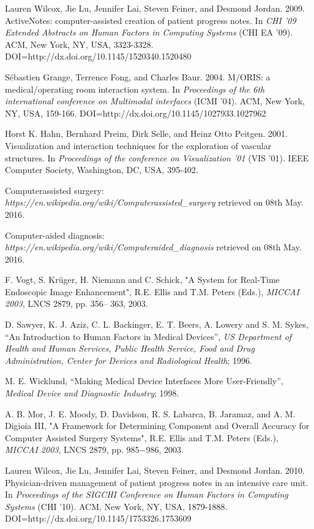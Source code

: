 \begin{thebibliography}{}
\bibitem{} Lauren Wilcox, Jie Lu, Jennifer Lai, Steven Feiner, and Desmond Jordan. 2009. ActiveNotes: computer-assisted creation of patient progress notes. In \emph{CHI '09 Extended Abstracts on Human Factors in Computing Systems} (CHI EA '09). ACM, New York, NY, USA, 3323-3328. DOI=http://dx.doi.org/10.1145/1520340.1520480

\bibitem{} Sébastien Grange, Terrence Fong, and Charles Baur. 2004. M/ORIS: a medical/operating room interaction system. In \emph{Proceedings of the 6th international conference on Multimodal interfaces} (ICMI '04). ACM, New York, NY, USA, 159-166. DOI=http://dx.doi.org/10.1145/1027933.1027962

\bibitem{} Horst K. Hahn, Bernhard Preim, Dirk Selle, and Heinz Otto Peitgen. 2001. Visualization and interaction techniques for the exploration of vascular structures. In \emph{Proceedings of the conference on Visualization '01} (VIS '01). IEEE Computer Society, Washington, DC, USA, 395-402.

\bibitem{} Computer\-assisted surgery: \emph{https://en.wikipedia.org/wiki/Computer\-assisted\_surgery} retrieved on 08th May. 2016.

\bibitem{} Computer-aided diagnosis: \emph{https://en.wikipedia.org/wiki/Computer\-aided\_diagnosis} retrieved on 08th May. 2016.

\bibitem{} F. Vogt, S. Krüger, H. Niemann and C. Schick, "A System
for Real-Time Endoscopic Image Enhancement", R.E. Ellis
and T.M. Peters (Eds.), \emph{MICCAI 2003}, LNCS 2879, pp. 356–
363, 2003.

\bibitem{} D. Sawyer, K. J. Aziz, C. L. Backinger, E. T. Beers, A.
Lowery and S. M. Sykes, “An Introduction to Human
Factors in Medical Devices”, \emph{US Department of Health and
Human Services, Public Health Service, Food and Drug
Administration, Center for Devices and Radiological Health}; 1996.

\bibitem{} M. E. Wicklund, “Making Medical Device Interfaces More
User-Friendly”, \emph{Medical Device and Diagnostic Industry}; 1998.

\bibitem{} A. B. Mor, J. E. Moody, D. Davidson, R. S. Labarca, B.
Jaramaz, and A. M. Digioia III, "A Framework for
Determining Component and Overall Accuracy for
Computer Assisted Surgery Systems", R.E. Ellis and T.M.
Peters (Eds.), \emph{MICCAI 2003}, LNCS 2879, pp. 985−986,
2003.

\bibitem{} Lauren Wilcox, Jie Lu, Jennifer Lai, Steven Feiner, and Desmond Jordan. 2010. Physician-driven management of patient progress notes in an intensive care unit. In \emph{Proceedings of the SIGCHI Conference on Human Factors in Computing Systems} (CHI '10). ACM, New York, NY, USA, 1879-1888. DOI=http://dx.doi.org/10.1145/1753326.1753609


\end{thebibliography}
